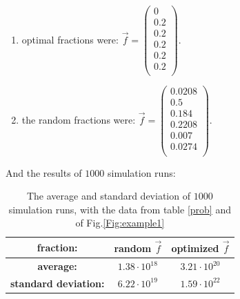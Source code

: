 \documentclass{article}
\begin{document}
	\begin{enumerate}
		\item optimal fractions were: \begin{math}
			\overrightarrow{f} = 
			\begin{pmatrix}
				0 \\
				0.2 \\
				0.2 \\
				0.2 \\
				0.2 \\
				0.2 \\
			\end{pmatrix}
		\end{math}.
		\item the random fractions were: 
		\begin{math}
			\overrightarrow{f} = 
			\begin{pmatrix}
				0.0208\\
				0.5\\
				0.184\\
				0.2208\\
				0.007\\
				0.0274\\
			\end{pmatrix}
		\end{math}.
	\end{enumerate}
	
	And the results of $1000$ simulation runs:
	
	\begin{table}[!h]
		\centering\begin{tabular}{|c||c|c|}
			\hline
			\textbf{fraction:} &random $\overrightarrow{f}$ &optimized $\overrightarrow{f}$ \\
			\hline\hline
			\textbf{average:}  & $1.38\cdot 10^{18}$ & $3.21\cdot 10^{20}$ \\
			\hline
			\textbf{standard deviation:}  & $6.22\cdot 10^{19}$ & $1.59\cdot 10^{22}$ \\
			\hline
		\end{tabular}
		\caption{The average and standard deviation of $1000$ simulation runs, with the data from table \ref{prob} and of Fig.\ref{Fig:example1}}
		\label{example:results}
	\end{table}
	
\end{document}
